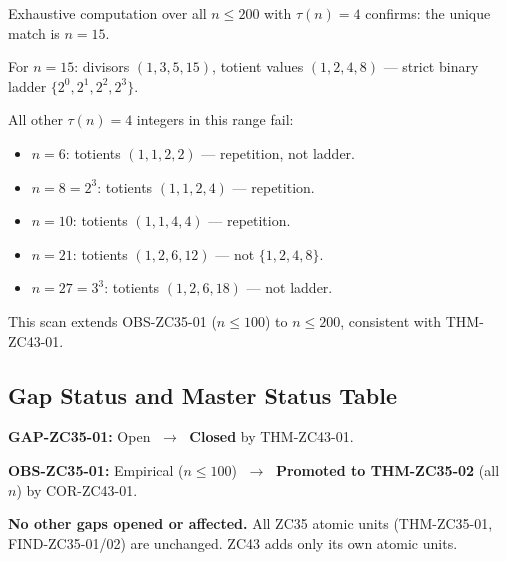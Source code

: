 \documentclass[12pt, a4paper]{article}
\begin{document}
\begin{derivedbox}[title={Numerical Confirmation:
  $n \leq 200$ Exhaustive Scan}]
Exhaustive computation over all $n \leq 200$ with $\tau(n) = 4$
confirms: the unique match is $n = 15$.

\medskip
For $n = 15$: divisors $(1, 3, 5, 15)$, totient values
$(1, 2, 4, 8)$ --- strict binary ladder $\{2^0, 2^1, 2^2, 2^3\}$.

\medskip
All other $\tau(n) = 4$ integers in this range fail:
\begin{itemize}[leftmargin=*, noitemsep]
\item $n = 6$: totients $(1, 1, 2, 2)$ --- repetition, not ladder.
\item $n = 8 = 2^3$: totients $(1, 1, 2, 4)$ --- repetition.
\item $n = 10$: totients $(1, 1, 4, 4)$ --- repetition.
\item $n = 21$: totients $(1, 2, 6, 12)$ --- not $\{1,2,4,8\}$.
\item $n = 27 = 3^3$: totients $(1, 2, 6, 18)$ --- not ladder.
\end{itemize}
This scan extends OBS-ZC35-01 ($n \leq 100$) to $n \leq 200$,
consistent with THM-ZC43-01.
\end{derivedbox}

\subsection{Gap Status and Master Status Table}


\begin{keybox}[title={Gap Closures and Promotions}]
\textbf{GAP-ZC35-01:} Open $\;\to\;$ \textbf{Closed} by
THM-ZC43-01.

\textbf{OBS-ZC35-01:} Empirical ($n \leq 100$)
$\;\to\;$ \textbf{Promoted to THM-ZC35-02} (all $n$)
by COR-ZC43-01.

\textbf{No other gaps opened or affected.}
All ZC35 atomic units (THM-ZC35-01, FIND-ZC35-01/02)
are unchanged. ZC43 adds only its own atomic units.
\end{keybox}

\bigskip
\end{document}
